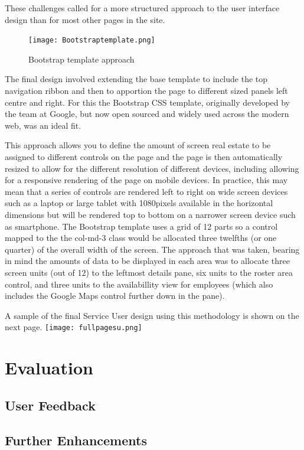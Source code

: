 \documentclass[a4paper,12pt]{article}
\begin{document}
These challenges called for a more structured approach to the user interface design than for most other pages in the site. 

 \begin{figure}[h!]
\texttt{[image: Bootstraptemplate.png]}
  \caption{Bootstrap template approach}
  \label{fig:Bootstraptemplate}
\end{figure}

The final design involved extending the base template to include the top navigation ribbon and then to apportion the page to different sized panels left centre and right. For this the Bootstrap CSS template,  originally developed by the team at Google, but now open sourced and widely used across the modern web, was an ideal fit.

This approach allows you to define the amount of screen real estate to be assigned to different controls on the page and the page is then automatically resized to allow for the different resolution of different devices, including allowing for a responsive rendering of the page on mobile devices. In practice, this may mean that a series of controls are rendered left to right on wide screen devices such as a laptop or large tablet with 1080pixels available in the horizontal dimensions but will be rendered top to bottom on a narrower screen device such as smartphone. The Bootstrap template uses a grid of 12 parts so a control mapped to the the col-md-3 class  would be allocated three twelfths (or one quarter) of the overall width of the screen. The approach that was taken, bearing in mind the amounts of data to be displayed in each area was to allocate three screen units (out of 12) to the leftmost details pane, six units to the roster area control, and three units to the availabillity view for employees (which also includes the Google Maps control further down in the pane).

A sample of the final Service User design using this methodology is shown on the next page.
 \center
\texttt{[image: fullpagesu.png]}


\section {Evaluation}
\subsection {User Feedback}
\subsection {Further Enhancements}
\end{document}
